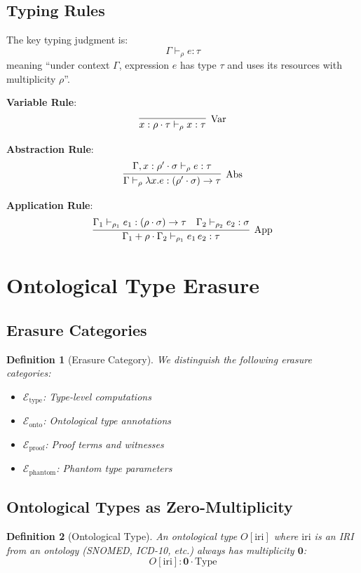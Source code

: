 \documentclass[11pt]{article}
\newtheorem{definition}{Definition}
\newcommand{\mult}{\rho}
\newcommand{\zero}{\mathbf{0}}
\begin{document}
\subsection{Typing Rules}

The key typing judgment is:
\[
\Gamma \vdash_\mult e : \tau
\]
meaning ``under context $\Gamma$, expression $e$ has type $\tau$ and uses
its resources with multiplicity $\mult$''.

\textbf{Variable Rule}:
\[
\infer[\text{Var}]{x : \mult \cdot \tau \vdash_\mult x : \tau}{}
\]

\textbf{Abstraction Rule}:
\[
\infer[\text{Abs}]{\Gamma \vdash_\mult \lambda x. e : (\mult' \cdot \sigma) \to \tau}
      {\Gamma, x : \mult' \cdot \sigma \vdash_\mult e : \tau}
\]

\textbf{Application Rule}:
\[
\infer[\text{App}]{\Gamma_1 + \mult \cdot \Gamma_2 \vdash_{\mult_1} e_1\,e_2 : \tau}
      {\Gamma_1 \vdash_{\mult_1} e_1 : (\mult \cdot \sigma) \to \tau &
       \Gamma_2 \vdash_{\mult_2} e_2 : \sigma}
\]

\section{Ontological Type Erasure}

\subsection{Erasure Categories}

\begin{definition}[Erasure Category]
We distinguish the following erasure categories:
\begin{itemize}
\item $\mathcal{E}_{\text{type}}$: Type-level computations
\item $\mathcal{E}_{\text{onto}}$: Ontological type annotations
\item $\mathcal{E}_{\text{proof}}$: Proof terms and witnesses
\item $\mathcal{E}_{\text{phantom}}$: Phantom type parameters
\end{itemize}
\end{definition}

\subsection{Ontological Types as Zero-Multiplicity}

\begin{definition}[Ontological Type]
An ontological type $O[\text{iri}]$ where $\text{iri}$ is an IRI from an
ontology (SNOMED, ICD-10, etc.) always has multiplicity $\zero$:
\[
O[\text{iri}] : \zero \cdot \text{Type}
\]
\end{definition}
\end{document}
